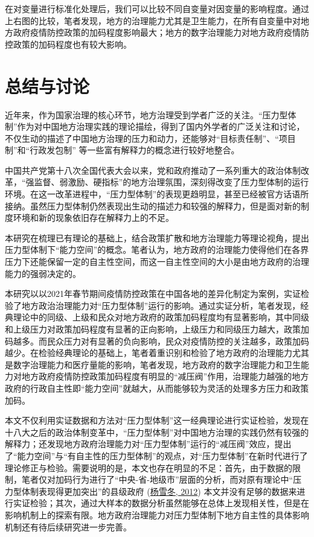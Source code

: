 \documentclass[
  12pt,
]{ctexart}
\begin{document}
在对变量进行标准化处理后，我们可以比较不同自变量对因变量的影响程度。通过上右图的比较，笔者发现，地方的治理能力尤其是卫生能力，在所有自变量中对地方政府疫情防控政策的加码程度影响最大；地方的数字治理能力对地方政府疫情防控政策的加码程度也有较大影响。

\hypertarget{ux603bux7ed3ux4e0eux8ba8ux8bba}{%
\section{总结与讨论}\label{ux603bux7ed3ux4e0eux8ba8ux8bba}}

近年来，作为国家治理的核心环节，地方治理受到学者广泛的关注。``压力型体制''作为对中国地方治理实践的理论描绘，得到了国内外学者的广泛关注和讨论，不仅生动的描述了中国地方治理的压力和动力，还能够对``目标责任制''、``项目制''和``行政发包制'' 等一些富有解释力的概念进行较好地整合。

中国共产党第十八次全国代表大会以来，党和政府推动了一系列重大的政治体制改革，``强监督、弱激励、硬指标''的地方治理氛围，深刻得改变了压力型体制的运行环境。在这一改革进程中，``压力型体制''的表现更趋明显，甚至已经被官方话语所接纳。虽然压力型体制仍然表现出生动的描述力和较强的解释力，但是面对新的制度环境和新的现象依旧存在解释力上的不足。

本研究在梳理已有理论的基础上，结合政策扩散和地方治理能力等理论视角，提出压力型体制下``能力空间''的概念。笔者认为，地方政府的治理能力使得他们在各界压力下还能保留一定的自主性空间，而这一自主性空间的大小是由地方政府的治理能力的强弱决定的。

本研究以以2021年春节期间疫情防控政策在中国各地的差异化制定为案例，实证检验了地方政治治理能力对``压力型体制''运行的影响。通过实证分析，笔者发现，经典理论中的同级、上级和民众对地方政府的政策加码程度均有显著影响，其中同级和上级压力对政策加码程度有显著的正向影响，上级压力和同级压力越大，政策加码越多。而民众压力对有显著的负向影响，民众对疫情防控的关注越多，政策加码越少。在检验经典理论的基础上，笔者着重识别和检验了地方政府的治理能力尤其是数字治理能力和医疗量能的影响，笔者发现，地方政府的数字治理能力和卫生能力对地方政府疫情防控政策加码程度有明显的``减压阀''作用，治理能力越强的地方政府的行政自主性即``能力空间''就越大，从而能够较为灵活的处理多方压力和政策加码。

本文不仅利用实证数据和方法对``压力型体制''这一经典理论进行实证检验，发现在十八大之后的政治体制变革中，``压力型体制''对中国地方治理的实践仍然有较强的解释力；还发现地方政府治理能力对``压力型体制''运行的``减压阀''效应，提出了``能力空间''与``有自主性的压力型体制''的观点，对``压力型体制''在新时代进行了理论修正与检验。需要说明的是，本文也存在明显的不足：首先，由于数据的限制，笔者仅对加码行为进行了``中央-省-地级市''层面的分析，而对原有理论中``压力型体制表现得更加突出''的县级政府 (\protect\hyperlink{ref-YangXueDong2012}{杨雪冬, 2012}) 本文并没有足够的数据来进行实证检验；其次，通过大样本的数据分析虽然能够在总体上发现相关性，但是在影响机制上的探索有限。地方政府治理能力对压力型体制下地方自主性的具体影响机制还有待后续研究进一步完善。
\end{document}
